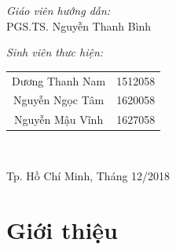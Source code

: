 \documentclass[a4paper,14pt]{extreport}
\begin{document}
\begin{titlepage}
    \begin{minipage}[t]{0.4\textwidth}
        \begin{flushleft}\large
            \emph{Giáo viên hướng dẫn:}
            \\PGS.TS. Nguyễn Thanh Bình
        \end{flushleft}
    \end{minipage}
    \begin{minipage}[t]{0.7\textwidth}
        \begin{flushright}\large
        \emph{Sinh viên thưc hiện:}\\ 
            \begin{tabular}{ c c }
                Dương Thanh Nam & 1512058\\ 
                Nguyễn Ngọc Tâm & 1620058\\  
                Nguyễn Mậu Vĩnh & 1627058\\    
            \end{tabular}
        \end{flushright}
    \end{minipage}\\

    \begin{center}
        {\footnotesize Tp. Hồ Chí Minh, Tháng 12/2018}
    \end{center}
\end{titlepage}
\newpage
\tableofcontents

\newpage


\chapter{Giới thiệu}
\end{document}
